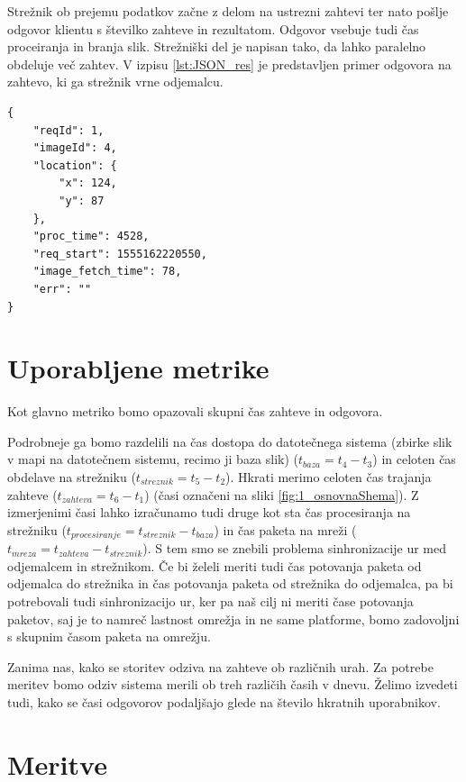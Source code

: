Strežnik ob prejemu podatkov začne z delom na ustrezni zahtevi ter nato pošlje odgovor klientu s številko zahteve in rezultatom. Odgovor vsebuje tudi čas proceiranja in branja slik. Strežniški del je napisan tako, da lahko paralelno obdeluje več zahtev. V izpisu  \ref{lst:JSON_res} je predstavljen primer odgovora na zahtevo, ki ga strežnik vrne odjemalcu.

\begin{lstlisting}[caption={Primer JSON odgovora.},label={lst:JSON_res},captionpos=b]
{
	"reqId": 1,
	"imageId": 4,
	"location": {
		"x": 124,
		"y": 87	
	},
	"proc_time": 4528,
	"req_start": 1555162220550,
	"image_fetch_time": 78,
	"err": ""
}
\end{lstlisting}

\section{Uporabljene metrike}

Kot glavno metriko bomo opazovali skupni čas zahteve in odgovora.

Podrobneje ga bomo razdelili na čas dostopa do datotečnega sistema (zbirke slik v mapi na datotečnem sistemu, recimo ji baza slik) ($t_{baza} = t_4 - t_3$) in celoten čas obdelave na strežniku ($t_{streznik} = t_5 - t_2$). Hkrati merimo celoten čas trajanja zahteve ($t_{zahteva} = t_6 - t_1$) (časi označeni na sliki \ref{fig:1_osnovnaShema}). Z izmerjenimi časi lahko izračunamo tudi druge kot sta čas procesiranja na strežniku ($t_{procesiranje} = t_{streznik} - t_{baza}$) in čas paketa na mreži ($t_{mreza} = t_{zahteva} - t_{streznik}$). S tem smo se znebili problema sinhronizacije ur med odjemalcem in strežnikom. Če bi želeli meriti tudi čas potovanja paketa od odjemalca do strežnika in čas potovanja paketa od strežnika do odjemalca, pa bi potrebovali tudi sinhronizacijo ur, ker pa naš cilj ni meriti čase potovanja paketov, saj je to namreč lastnost omrežja in ne same platforme, bomo zadovoljni s skupnim časom paketa na omrežju.

Zanima nas, kako se storitev odziva na zahteve ob različnih urah. Za potrebe meritev bomo odziv sistema merili ob treh različih časih v dnevu. Želimo izvedeti tudi, kako se časi odgovorov podaljšajo glede na število hkratnih uporabnikov.

\section{Meritve}

